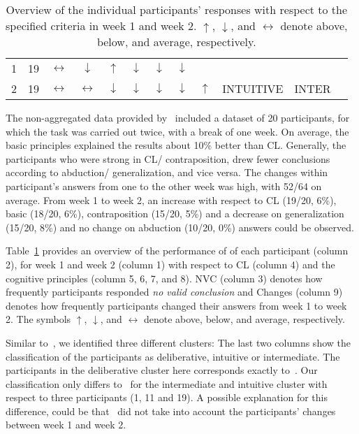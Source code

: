 \documentclass[12pt]{article}
\begin{document}
\begin{table}[htp]
\begin{tabular}{cccccccccccc}
1&19&$\leftrightarrow$&$\downarrow$&$\uparrow$&$\downarrow$&$\downarrow$&$\downarrow$ &&&\\
2&19&$\leftrightarrow$&$\leftrightarrow$&$\downarrow$&$\downarrow$&$\downarrow$&$\downarrow$ &\multirow{-2}{*}{$\uparrow$}& \multirow{-2}{*}{INTUITIVE}& \multirow{-2}{*}{INTER}\\ \bottomrule
\end{tabular}
\caption{Overview of the individual participants' responses with respect to the specified criteria in week 1 and week 2.
$\uparrow$, $\downarrow$, and $\leftrightarrow$ denote above, below, and average, respectively.
\label{tab:individual}}
\end{table}

The non-aggregated data provided by~\cite{khemlani:2016} included a dataset of 20 participants,
for which the task was carried out twice, with a break of one week. On average, the basic principles explained the results about 10\% better than CL.
 Generally, the participants who were strong in CL/ contraposition, drew fewer conclusions according to abduction/ generalization, and vice versa.
 The changes within participant's answers from one to the other week was high, with 52/64 on average. 
 From week 1 to week 2, an increase with respect to CL (19/20, 6\%), basic (18/20, 6\%), contraposition (15/20, 5\%)
 and a decrease on generalization (15/20, 8\%) and no change on abduction (10/20, 0\%) answers could be observed.

Table~\ref{tab:individual} provides an overview of the performance of of each participant (column 2), for week 1 and week 2 (column 1)
with respect to CL (column 4) and the cognitive principles (column 5, 6, 7, and 8).
NVC (column 3) denotes how frequently participants responded \textit{no valid conclusion} and Changes (column 9) denotes how
frequently participants changed their answers from week 1 to week 2. 
The symbols $\uparrow$, $\downarrow$, and $\leftrightarrow$ denote above, below, and average, respectively.

Similar to~\cite{khemlani:2016}, we identified three different clusters: 
The last two columns show the classification of the participants as deliberative, intuitive or intermediate. The participants in the deliberative cluster here corresponds exactly to~\cite{khemlani:2016}. 
Our classification only differs to~\cite{khemlani:2016} for the intermediate and intuitive cluster with respect to three participants (1, 11 and 19).
A possible explanation for this difference, could be that~\cite{khemlani:2016}
did not take into account the participants' changes between week 1 and week 2.
\end{document}
